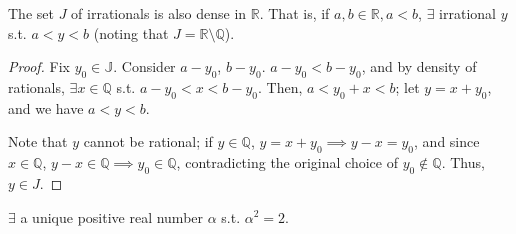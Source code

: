 \documentclass[12pt]{article}
\begin{document}
\begin{theorem}
  The set $J$ of irrationals is also dense in $\mathbb{R}$. That is, if $a,b \in \mathbb{R}, a < b$, $\exists$ irrational $y$ s.t. $a < y < b$ (noting that $J = \mathbb{R} \setminus \mathbb{Q}$).
\end{theorem}

\begin{proof}
  Fix $y_0 \in \mathbb{J}$. Consider $a - y_0$, $b - y_0$. $a - y_0 < b - y_0$, and by density of rationals, $\exists x \in \mathbb{Q}$ s.t. $a - y_0 < x < b - y_0$. Then, $a < y_0 + x < b$; let $y = x+y_0$, and we have $a < y < b$.

  Note that $y$ cannot be rational; if $y \in \mathbb{Q}$, $y = x + y_0 \implies y - x = y_0$, and since $x \in \mathbb{Q}$, $y - x \in \mathbb{Q} \implies y_0 \in \mathbb{Q}$, contradicting the original choice of $y_0 \notin \mathbb{Q}$. Thus, $y \in J$.
\end{proof}

\begin{theorem}
  $\exists$ a unique positive real number $\alpha$ s.t. $\alpha^2 = 2$.
\end{theorem}
\end{document}
